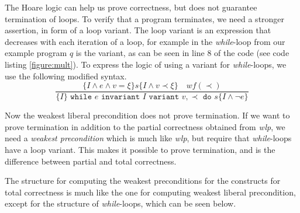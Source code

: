 
The Hoare logic can help us prove correctness, but does not guarantee termination of loops. To verify that a program terminates, we need a stronger assertion, in form of a loop variant.
The loop variant is an expression that decreases with each iteration of a loop, for example in the \textit{while}-loop from our example program $q$ is the variant, as can be seen in line 8 of the code (see code listing \autoref{figure:mult}).
To express the logic of using a variant for \textit{while}-loops, we use the following modified syntax.
$$
	\frac{
		\{I \land e \land v = \xi \} s \{I \land v \prec \xi \} \quad wf(\prec)
	}{
		\{I\} \texttt{ while } e \texttt{ invariant } I 
          \texttt{ variant } v, \prec \texttt{ do } s \{I \land \neg e\}
	}
$$

Now the weakest liberal precondition does not prove termination. If we want to prove termination in addition to the partial correctness obtained from \textit{wlp}, we need a \textit{weakest precondition} which is much like \textit{wlp}, but require that \textit{while}-loops have a loop variant. 
This makes it possible to prove termination, and is the difference between partial and total correctness.

The structure for computing the weakest preconditions for the constructs for total correctness is much like the one for computing weakest liberal precondition, except for the structure of \textit{while}-loops, which can be seen below.

